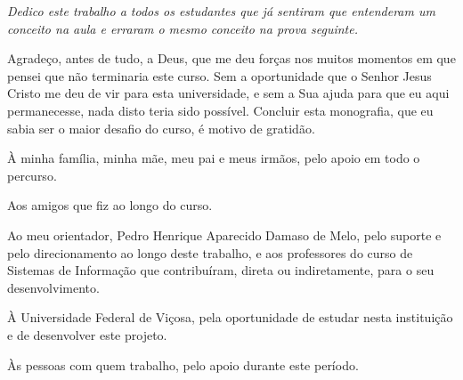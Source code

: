 \documentclass[
12pt,
openright,
oneside,
a4paper,
sumario=tradicional,
english,
brazil
]{abntex2}
\begin{document}

	\frenchspacing
	\OnehalfSpacing

	\pretextual

	\imprimircapa
	\imprimirfolhaderosto

	\imprimirfolhadeaprovacao

	\begin{dedicatoria}
		\vspace*{\fill}
		\centering
		\noindent
		\textit{Dedico este trabalho a todos os estudantes que já
			sentiram que entenderam um conceito na aula e erraram o
			mesmo conceito na prova seguinte.}
		\vspace*{\fill}
	\end{dedicatoria}

	\begin{agradecimentos}
		Agradeço, antes de tudo, a Deus, que me deu forças nos muitos
		momentos em que pensei que não terminaria este curso. Sem a
		oportunidade que o Senhor Jesus Cristo me deu de vir para esta
		universidade, e sem a Sua ajuda para que eu aqui permanecesse,
		nada disto teria sido possível. Concluir esta monografia, que eu
		sabia ser o maior desafio do curso, é motivo de gratidão.

		À minha família, minha mãe, meu pai e meus irmãos, pelo apoio em
		todo o percurso.

		Aos amigos que fiz ao longo do curso.

		Ao meu orientador, Pedro Henrique Aparecido Damaso de Melo, pelo
		suporte e pelo direcionamento ao longo deste trabalho, e aos
		professores do curso de Sistemas de Informação que contribuíram,
		direta ou indiretamente, para o seu desenvolvimento.

		À Universidade Federal de Viçosa, pela oportunidade de estudar
		nesta instituição e de desenvolver este projeto.

		Às pessoas com quem trabalho, pelo apoio durante este período.
	\end{agradecimentos}

	
	\cleardoublepage
\end{document}
